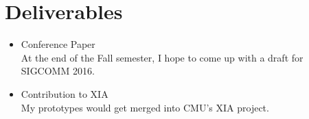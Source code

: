 \section{Deliverables}
\begin{itemize}
\item Conference Paper \\ At the end of the Fall semester, I hope to
  come up with a draft for SIGCOMM 2016.
\item Contribution to XIA \\ My prototypes would get merged into CMU's
  XIA project.
\end{itemize}
